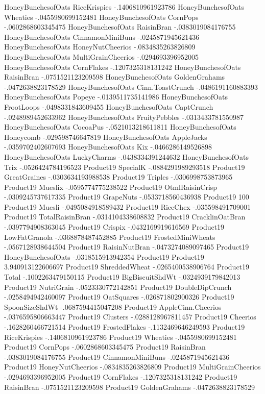 HoneyBunchesofOats	RiceKrispies	-.1406810961923786
HoneyBunchesofOats	Wheaties	-.0455980699152481
HoneyBunchesofOats	CornPops	-.0602868603345475
HoneyBunchesofOats	RaisinBran	-.0383019084176755
HoneyBunchesofOats	CinnamonMiniBuns	-.0245871945621436
HoneyBunchesofOats	HoneyNutCheerios	-.0834835263826809
HoneyBunchesofOats	MultiGrainCheerios	-.0294693396952005
HoneyBunchesofOats	CornFlakes	-.1207325318131242
HoneyBunchesofOats	RaisinBran	-.0751521123209598
HoneyBunchesofOats	GoldenGrahams	-.0472638823178529
HoneyBunchesofOats	Cinn.ToastCrunch	-.0486191160883393
HoneyBunchesofOats	Popeye	-.0139511735141986
HoneyBunchesofOats	FrootLoops	-.0498331843609455
HoneyBunchesofOats	CaptCrunch	-.0248989452633962
HoneyBunchesofOats	FruityPebbles	-.0313433781550987
HoneyBunchesofOats	CocoaPus	-.0521013218611811
HoneyBunchesofOats	Honeycomb	-.029598746647819
HoneyBunchesofOats	AppleJacks	-.0359702402607693
HoneyBunchesofOats	Kix	-.0466286149526898
HoneyBunchesofOats	LuckyCharms	-.0438334391244632
HoneyBunchesofOats	Trix	-.0526424784196523
Product19	SpecialK	-.0884291989293518
Product19	GreatGraines	-.0303634193988538
Product19	Triples	-.0306998753873965
Product19	Mueslix	-.0595774775238522
Product19	OtmlRaisinCrisp	-.0309245737617335
Product19	GrapeNuts	-.0533718560436938
Product19	100%
Product19	Muesli	-.0495084918589432
Product19	RiceChex	-.035598491709001
Product19	TotalRaisinBran	-.0314104338608832
Product19	CracklinOatBran	-.0397794908363045
Product19	Crispix	-.0432169919616569
Product19	LowFatGranola	-.0368878487452885
Product19	FrostedMiniWheats	-.0567128938644504
Product19	RaisinNutBran	-.0473274089097465
Product19	HoneyBunchesofOats	-.0318515913942354
Product19	Product19	3.940913122606697
Product19	ShreddedWheat	-.0265400538906764
Product19	Total	-.1002263479150115
Product19	BigBiscuitShdWt	-.0324939179842013
Product19	NutriGrain	-.0523330772142851
Product19	DoubleDipCrunch	-.0258494942460097
Product19	OatSquares	-.026871802900326
Product19	SpoonSizeShdWt	-.0687594415047208
Product19	AppleCinn.Cheerios	-.0376595806663447
Product19	Clusters	-.0288128967811457
Product19	Cheerios	-.1628260466721514
Product19	FrostedFlakes	-.1132469646249593
Product19	RiceKrispies	-.1406810961923786
Product19	Wheaties	-.0455980699152481
Product19	CornPops	-.0602868603345475
Product19	RaisinBran	-.0383019084176755
Product19	CinnamonMiniBuns	-.0245871945621436
Product19	HoneyNutCheerios	-.0834835263826809
Product19	MultiGrainCheerios	-.0294693396952005
Product19	CornFlakes	-.1207325318131242
Product19	RaisinBran	-.0751521123209598
Product19	GoldenGrahams	-.0472638823178529
